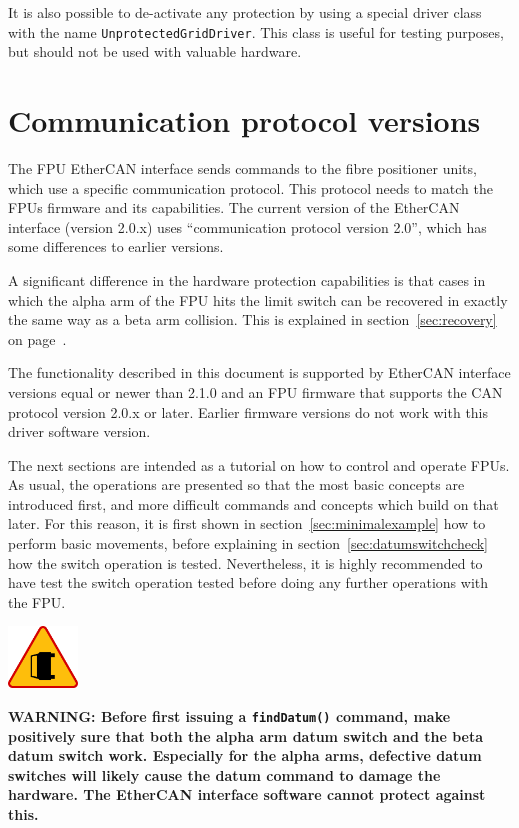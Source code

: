 \documentclass[fontsize=12,a4paper]{scrreprt}
\newenvironment{warning}{\begin{framed}\includegraphics[width=5em]{accident-area-ahead.png}
}{\end{framed}}
\begin{document}
It is also possible to de-activate any protection by using a special
driver class with the name \texttt{UnprotectedGridDriver}. This class
is useful for testing purposes, but should not be used with valuable
hardware.



\section{Communication protocol versions}
 
 The FPU EtherCAN interface
sends commands to the fibre positioner units, which use a specific
communication protocol. This protocol needs to match the FPUs firmware
and its capabilities. The current version of the EtherCAN interface (version
2.0.x) uses ``communication protocol version 2.0'', which has some
differences to earlier versions.

A significant difference in the hardware protection capabilities is
that cases in which the alpha arm of the FPU hits the limit switch can
be recovered in exactly the same way as a beta arm collision. This is
explained in section~\ref{sec:recovery} on
page~\pageref{sec:recovery}.


The functionality described in this document is supported by EtherCAN
interface versions equal or newer than 2.1.0 and an FPU firmware that
supports the CAN protocol version 2.0.x or later. Earlier firmware
versions do not work with this driver software version.

The next sections are intended as a tutorial on how to control and
operate FPUs. As usual, the operations are presented so that the most
basic concepts are introduced first, and more difficult commands and
concepts which build on that later. For this reason, it is first shown
in section~\ref{sec:minimalexample} how to perform basic movements,
before explaining in section~\ref{sec:datumswitchcheck} how the switch
operation is tested. Nevertheless, it is highly recommended to have
test the switch operation tested before doing any further operations
with the FPU.

\begin{warning}
  \textbf{WARNING: Before first issuing a \texttt{findDatum()}
    command, make positively sure that both the alpha arm datum switch
    and the beta datum switch work. Especially for the alpha arms,
    defective datum switches will likely cause the datum command to
    damage the hardware. The EtherCAN interface software cannot protect against
    this.}
\end{warning}
\end{document}

